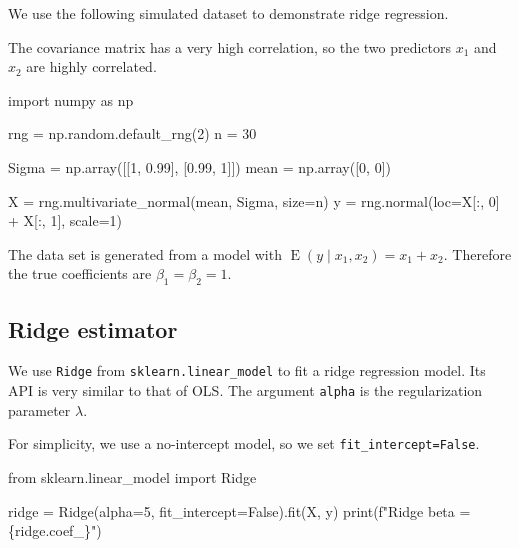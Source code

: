 \documentclass[
  letterpaper,
  DIV=11,
  numbers=noendperiod]{scrreprt}
\newenvironment{Shaded}{\begin{snugshade}}{\end{snugshade}}
\newcommand{\BuiltInTok}[1]{\textcolor[rgb]{0.00,0.23,0.31}{#1}}
\newcommand{\DecValTok}[1]{\textcolor[rgb]{0.68,0.00,0.00}{#1}}
\newcommand{\FloatTok}[1]{\textcolor[rgb]{0.68,0.00,0.00}{#1}}
\newcommand{\ImportTok}[1]{\textcolor[rgb]{0.00,0.46,0.62}{#1}}
\newcommand{\NormalTok}[1]{\textcolor[rgb]{0.00,0.23,0.31}{#1}}
\newcommand{\OperatorTok}[1]{\textcolor[rgb]{0.37,0.37,0.37}{#1}}
\newcommand{\SpecialCharTok}[1]{\textcolor[rgb]{0.37,0.37,0.37}{#1}}
\newcommand{\SpecialStringTok}[1]{\textcolor[rgb]{0.13,0.47,0.30}{#1}}
\newcommand{\VariableTok}[1]{\textcolor[rgb]{0.07,0.07,0.07}{#1}}
\newcommand{\Exp}{\operatorname{E}}
\theoremstyle{definition}
\theoremstyle{definition}
\theoremstyle{plain}
\theoremstyle{plain}
\theoremstyle{remark}
\begin{document}
We use the following simulated dataset to demonstrate ridge regression.

The covariance matrix has a very high correlation, so the two predictors
\(x_1\) and \(x_2\) are highly correlated.

\begin{Shaded}
\begin{Highlighting}[]
\ImportTok{import}\NormalTok{ numpy }\ImportTok{as}\NormalTok{ np}

\NormalTok{rng }\OperatorTok{=}\NormalTok{ np.random.default\_rng(}\DecValTok{2}\NormalTok{)}
\NormalTok{n }\OperatorTok{=} \DecValTok{30}

\NormalTok{Sigma }\OperatorTok{=}\NormalTok{ np.array([[}\DecValTok{1}\NormalTok{, }\FloatTok{0.99}\NormalTok{], [}\FloatTok{0.99}\NormalTok{, }\DecValTok{1}\NormalTok{]])}
\NormalTok{mean }\OperatorTok{=}\NormalTok{ np.array([}\DecValTok{0}\NormalTok{, }\DecValTok{0}\NormalTok{])}

\NormalTok{X }\OperatorTok{=}\NormalTok{ rng.multivariate\_normal(mean, Sigma, size}\OperatorTok{=}\NormalTok{n)}
\NormalTok{y }\OperatorTok{=}\NormalTok{ rng.normal(loc}\OperatorTok{=}\NormalTok{X[:, }\DecValTok{0}\NormalTok{] }\OperatorTok{+}\NormalTok{ X[:, }\DecValTok{1}\NormalTok{], scale}\OperatorTok{=}\DecValTok{1}\NormalTok{)}
\end{Highlighting}
\end{Shaded}

The data set is generated from a model with
\(\Exp(y\mid x_1,x_2)=x_1+x_2\). Therefore the true coefficients are
\(\beta_1=\beta_2=1\).

\subsection{Ridge estimator}\label{ridge-estimator-1}

We use \texttt{Ridge} from \texttt{sklearn.linear\_model} to fit a ridge
regression model. Its API is very similar to that of OLS. The argument
\texttt{alpha} is the regularization parameter \(\lambda\).

For simplicity, we use a no-intercept model, so we set
\texttt{fit\_intercept=False}.

\begin{Shaded}
\begin{Highlighting}[]
\ImportTok{from}\NormalTok{ sklearn.linear\_model }\ImportTok{import}\NormalTok{ Ridge}

\NormalTok{ridge }\OperatorTok{=}\NormalTok{ Ridge(alpha}\OperatorTok{=}\DecValTok{5}\NormalTok{, fit\_intercept}\OperatorTok{=}\VariableTok{False}\NormalTok{).fit(X, y)}
\BuiltInTok{print}\NormalTok{(}\SpecialStringTok{f"Ridge beta = }\SpecialCharTok{\{}\NormalTok{ridge}\SpecialCharTok{.}\NormalTok{coef\_}\SpecialCharTok{\}}\SpecialStringTok{"}\NormalTok{)}
\end{Highlighting}
\end{Shaded}
\end{document}
